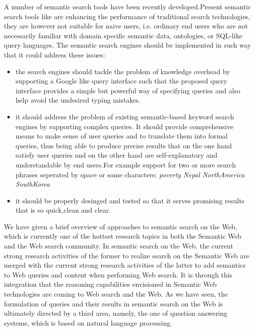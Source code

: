 \documentclass[12pt,a4]{article}
\begin{document}
A number of semantic search tools have been recently developed.Present semantic search tools like { } are enhancing the performance of traditional search technologies, they are however not suitable for naive users, i.e. ordinary end users who are not necessarily familiar with domain specific semantic data, ontologies, or SQL-like query languages. The semantic search engines should be implemented in such way that it could address these issues:
\begin{itemize}
\item the search engines should tackle the problem of knowledge overhead by supporting a Google like query interface such that the proposed query interface provides a simple but powerful way of specifying queries and also help avoid the undesired typing mistakes.
\item it should address the problem of existing semantic-based keyword search engines by supporting complex queries. It should provide comprehensive means to make sense of user queries and to translate them into formal queries, thus being able to produce precise results that on the one hand satisfy user queries and on the other hand are self-explanatory and understandable by end users.For example support for two or more search phrases seperated by space or some characters: \textit{poverty Nepal NorthAmerica SouthKorea } 
\item it should be properly desinged and tested so that it serves promising results that is so quick,clean and clear.
\end{itemize}

We have given a brief overview of approaches to semantic search on the Web, which is currently one of the hottest research topics in both the Semantic Web and the Web search community. In semantic search on the Web, the current strong research activities of the former to realize search on the Semantic Web are merged with the current strong research activities of the latter to add semantics to Web queries and content when performing Web search. It is through this integration that the reasoning capabilities envisioned in Semantic Web technologies are coming to Web search and the Web. As we have seen, the formulation of queries and their results in semantic search on the Web is ultimately directed by a third area, namely, the one of question answering systems, which is based on natural language processing.
\end{document}
